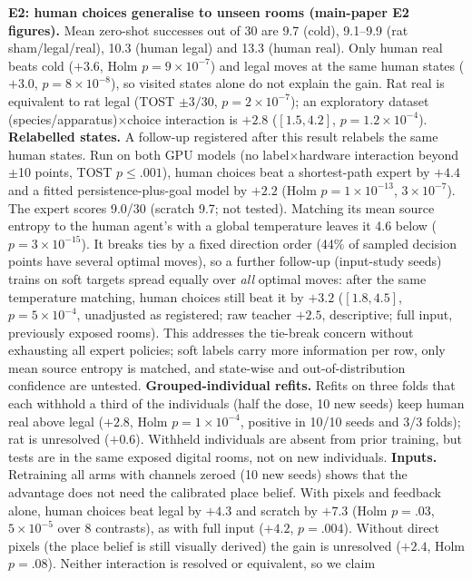 \documentclass[10pt,onecolumn,letterpaper]{article}
\begin{document}
\textbf{E2: human choices generalise to unseen rooms (main-paper E2 figures).} Mean zero-shot
successes out of 30 are 9.7 (cold), 9.1--9.9 (rat sham/legal/real), 10.3 (human legal) and 13.3 (human real). Only
human real beats cold ($+3.6$, Holm $p=9\times10^{-7}$) and legal moves at the same human states ($+3.0$,
$p=8\times10^{-8}$), so visited states alone do not explain the gain. Rat real is equivalent to rat legal (TOST
$\pm3/30$, $p=2\times10^{-7}$); an exploratory dataset (species/apparatus)$\times$choice interaction is $+2.8$ ($[1.5,4.2]$,
$p=1.2\times10^{-4}$). \textbf{Relabelled states.} A follow-up registered after this result relabels the same
human states. Run on both GPU models (no label$\times$hardware interaction beyond $\pm$10 points, TOST $p\leq.001$),
human choices beat a shortest-path expert by $+4.4$ and a fitted persistence-plus-goal model by $+2.2$ (Holm
$p=1\times10^{-13}$, $3\times10^{-7}$). The expert scores 9.0/30 (scratch 9.7; not tested). Matching its mean source
entropy to the human agent's with a global temperature leaves it 4.6 below ($p=3\times10^{-15}$). It breaks ties by a
fixed direction order (44\% of sampled decision points have several optimal moves), so a further follow-up (input-study
seeds) trains on soft targets spread equally over \emph{all} optimal moves: after the same temperature matching, human
choices still beat it by $+3.2$ ($[1.8,4.5]$, $p=5\times10^{-4}$, unadjusted as registered; raw teacher $+2.5$,
descriptive; full input, previously exposed rooms). This addresses the tie-break concern without exhausting all
expert policies; soft labels carry more information per row, only mean source entropy is matched, and state-wise and
out-of-distribution confidence are untested. \textbf{Grouped-individual
refits.} Refits on three folds that each withhold a third of the individuals (half the dose, 10 new seeds)
keep human real above legal ($+2.8$, Holm $p=1\times10^{-4}$, positive in 10/10 seeds and 3/3 folds); rat is
unresolved ($+0.6$). Withheld individuals are absent from prior training, but tests are in the same exposed digital rooms, not on new individuals.
\textbf{Inputs.} Retraining all arms with channels zeroed (10 new seeds) shows that the advantage does not need
the calibrated place belief. With pixels and feedback alone, human choices beat legal by $+4.3$ and scratch by
$+7.3$ (Holm $p=.03$, $5\times10^{-5}$ over 8 contrasts), as with full input ($+4.2$, $p=.004$). Without direct
pixels (the place belief is still visually derived) the gain is unresolved ($+2.4$, Holm $p=.08$). Neither interaction is resolved or equivalent, so we claim
\end{document}
